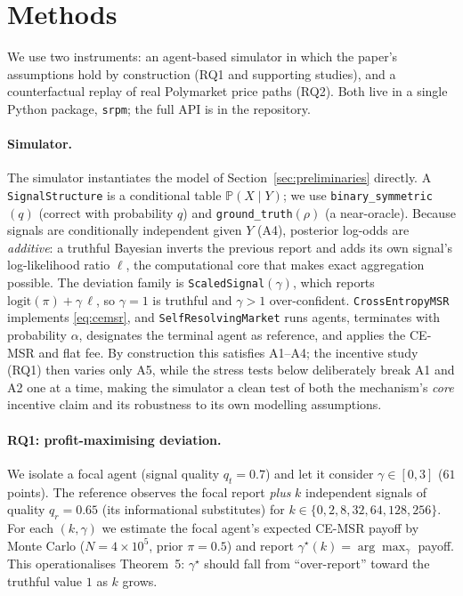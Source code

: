 \section{Methods}
\label{sec:methods}

We use two instruments: an agent-based simulator in which the paper's assumptions hold by
construction (RQ1 and supporting studies), and a counterfactual replay of real Polymarket
price paths (RQ2). Both live in a single Python package, \texttt{srpm}; the full API is in
the repository.

\paragraph{Simulator.}
The simulator instantiates the model of Section~\ref{sec:preliminaries} directly. A
\texttt{SignalStructure} is a conditional table $\mathbb{P}(X\mid Y)$; we use
\texttt{binary\_symmetric}$(q)$ (correct with probability $q$) and
\texttt{ground\_truth}$(\rho)$ (a near-oracle). Because signals are conditionally
independent given $Y$ (A4), posterior log-odds are \emph{additive}: a truthful Bayesian
inverts the previous report and adds its own signal's log-likelihood ratio $\ell$, the
computational core that makes exact aggregation possible. The deviation family is
\texttt{ScaledSignal}$(\gamma)$, which reports $\mathrm{logit}(\pi)+\gamma\,\ell$, so
$\gamma=1$ is truthful and $\gamma>1$ over-confident. \texttt{CrossEntropyMSR} implements
\eqref{eq:cemsr}, and \texttt{SelfResolvingMarket} runs agents, terminates with probability
$\alpha$, designates the terminal agent as reference, and applies the CE-MSR and flat fee.
By construction this satisfies A1--A4; the incentive study (RQ1) then varies only A5, while
the stress tests below deliberately break A1 and A2 one at a time, making the simulator a
clean test of both the mechanism's \emph{core} incentive claim and its robustness to its own
modelling assumptions.

\paragraph{RQ1: profit-maximising deviation.}
We isolate a focal agent (signal quality $q_t=0.7$) and let it consider $\gamma\in[0,3]$
($61$ points). The reference observes the focal report \emph{plus} $k$ independent signals
of quality $q_r=0.65$ (its informational substitutes) for
$k\in\{0,2,8,32,64,128,256\}$. For each $(k,\gamma)$ we estimate the focal agent's expected
CE-MSR payoff by Monte Carlo ($N=4\times10^5$, prior $\pi=0.5$) and report
$\gamma^\star(k)=\arg\max_\gamma$ payoff. This operationalises Theorem~5: $\gamma^\star$
should fall from ``over-report'' toward the truthful value $1$ as $k$ grows.

